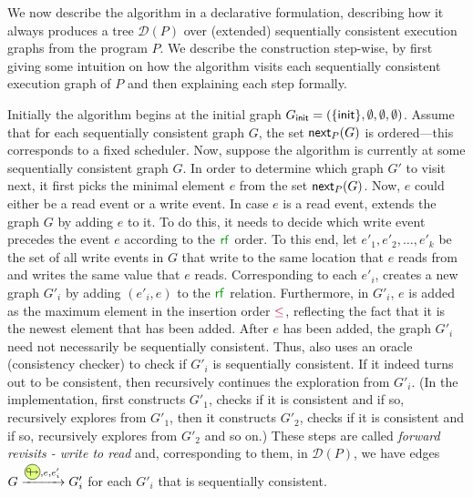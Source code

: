 We now describe the \trust algorithm in a declarative formulation, describing how it always produces a tree $\mathcal{D}(P)$ over (extended) sequentially consistent execution graphs from the program $P$. 
We describe the construction step-wise, by first giving some intuition on how the \trust algorithm visits each sequentially consistent execution graph of $P$ and then explaining each step formally.

Initially the \trust algorithm begins at the initial graph $G_{\mathsf{init}} = (\{\mathsf{init}\},\emptyset,\emptyset,\emptyset)$.
Assume that for each sequentially consistent graph $G$, the set $\mathsf{next}_{P}(G)$ is ordered---this corresponds to a fixed scheduler. Now, suppose the \trust algorithm
is currently at some sequentially consistent graph $G$. In order to determine which graph $G'$ to visit next, it first picks the minimal element $e$ from the set $\mathsf{next}_{P}(G)$. Now, $e$ could either be a read event or a write event. In case $e$ is a read event, \trust extends the graph $G$ by adding $e$ to it. To do this, it needs to decide which write event precedes the event $e$ according to the $\rf{}$ order.
To this end, let $e'_1,e'_2,\dots,e'_k$ be the set of all write events in $G$ that write to the same location that $e$ reads from and writes the same value that $e$ reads. Corresponding to each $e'_i$,
\trust creates a new graph $G'_i$ by adding $(e'_i,e)$ to the $\rf{}$ relation. Furthermore, in $G'_i$, $e$ is added as the maximum element in the insertion order $\textcolor{purple}\leq$, reflecting the fact that it is the newest element that has been added. After $e$ has been added, the graph $G'_i$ need not necessarily be sequentially consistent. Thus, \trust also uses an oracle (consistency checker) to check if $G'_i$ is sequentially consistent. If it indeed turns out to be consistent, \trust then recursively continues the exploration from $G'_i$. (In the implementation, \trust first constructs $G'_1$, checks if it is consistent and if so, recursively explores from $G'_1$, then it constructs $G'_2$, checks if it is consistent and if so, recursively explores from $G'_2$ and so on.) These steps are called \emph{forward revisits - write to read} and, corresponding to them, in $\mathcal{D}(P)$, we have edges $G \xrightarrow{\fwdtikz, e, e'_i} G'_i$ for each $G'_i$ that is sequentially consistent.


